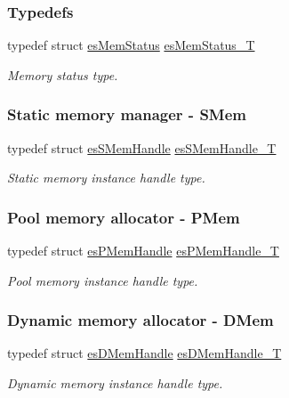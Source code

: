 \subsubsection*{Typedefs}
\begin{DoxyCompactItemize}
\item 
typedef struct \hyperlink{structesMemStatus}{es\-Mem\-Status} \hyperlink{group__mem__intf_ga0eb568b68247d93e2db804a681de0e9e}{es\-Mem\-Status\-\_\-\-T}
\begin{DoxyCompactList}\small\item\em Memory status type. \end{DoxyCompactList}\end{DoxyCompactItemize}
\subsubsection*{Static memory manager -\/ S\-Mem}
\begin{DoxyCompactItemize}
\item 
typedef struct \hyperlink{structesSMemHandle}{es\-S\-Mem\-Handle} \hyperlink{group__mem__intf_gabf19a317cc22713cfb45ae1e43d34d7e}{es\-S\-Mem\-Handle\-\_\-\-T}
\begin{DoxyCompactList}\small\item\em Static memory instance handle type. \end{DoxyCompactList}\end{DoxyCompactItemize}
\subsubsection*{Pool memory allocator -\/ P\-Mem}
\begin{DoxyCompactItemize}
\item 
typedef struct \hyperlink{structesPMemHandle}{es\-P\-Mem\-Handle} \hyperlink{group__mem__intf_gaf82f01d26c4f6bc9a2b672a673b09ce2}{es\-P\-Mem\-Handle\-\_\-\-T}
\begin{DoxyCompactList}\small\item\em Pool memory instance handle type. \end{DoxyCompactList}\end{DoxyCompactItemize}
\subsubsection*{Dynamic memory allocator -\/ D\-Mem}
\begin{DoxyCompactItemize}
\item 
typedef struct \hyperlink{structesDMemHandle}{es\-D\-Mem\-Handle} \hyperlink{group__mem__intf_gacaaf771b18b3da8fa3b67a466390080e}{es\-D\-Mem\-Handle\-\_\-\-T}
\begin{DoxyCompactList}\small\item\em Dynamic memory instance handle type. \end{DoxyCompactList}\end{DoxyCompactItemize}
